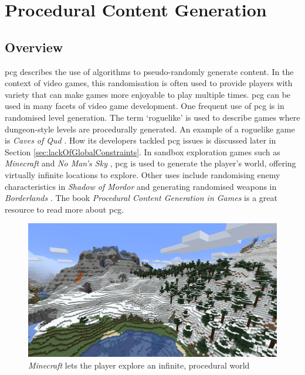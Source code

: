 \section{Procedural Content Generation}
\subsection{Overview}
\acrshort{pcg} describes the use of algorithms to pseudo-randomly generate content. In the context of video games, this randomisation is often used to provide players with variety that can make games more enjoyable to play multiple times. \acrlong{pcg} can be used in many facets of video game development. One frequent use of \acrshort{pcg} is in randomised level generation. The term `roguelike' is used to describe games where dungeon-style levels are procedurally generated. An example of a roguelike game is \textit{Caves of Qud} \cite{cavesofqud}. How its developers tackled \acrshort{pcg} issues is discussed later in Section \ref{sec:lackOfGlobalConstraints}. In sandbox exploration games such as \textit{Minecraft} \cite{minecraft} and \textit{No Man's Sky} \cite{nomanssky}, \acrshort{pcg} is used to generate the player's world, offering virtually infinite locations to explore. Other uses include randomising enemy characteristics in \textit{Shadow of Mordor} \cite{shadowofmordor} and generating randomised weapons in \textit{Borderlands} \cite{borderlands}. The book \textit{Procedural Content Generation in Games} \cite{pcgbook} is a great resource to read more about \acrshort{pcg}.

\begin{figure}[H]
    \centering
    \includegraphics[width=\textwidth, height=0.3\textheight, keepaspectratio]{Images/Minecraft.jpg}
    \caption{\textit{Minecraft} lets the player explore an infinite, procedural world \cite{minecraft_screenshot}}
    \label{fig:minecraftScreenshot}
\end{figure}

